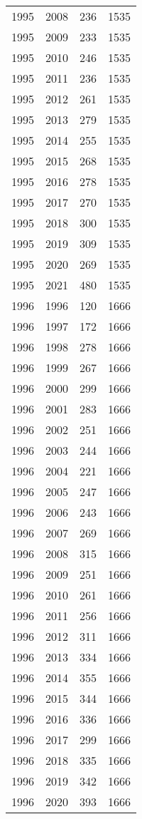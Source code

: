 \documentclass[
  10pt,
  letterpaper,
  DIV=11,
  numbers=noendperiod,
  twoside]{scrartcl}
\begin{document}
\begin{longtable}[]{@{}rrrr@{}}
1995 & 2008 & 236 & 1535 \\
1995 & 2009 & 233 & 1535 \\
1995 & 2010 & 246 & 1535 \\
1995 & 2011 & 236 & 1535 \\
1995 & 2012 & 261 & 1535 \\
1995 & 2013 & 279 & 1535 \\
1995 & 2014 & 255 & 1535 \\
1995 & 2015 & 268 & 1535 \\
1995 & 2016 & 278 & 1535 \\
1995 & 2017 & 270 & 1535 \\
1995 & 2018 & 300 & 1535 \\
1995 & 2019 & 309 & 1535 \\
1995 & 2020 & 269 & 1535 \\
1995 & 2021 & 480 & 1535 \\
1996 & 1996 & 120 & 1666 \\
1996 & 1997 & 172 & 1666 \\
1996 & 1998 & 278 & 1666 \\
1996 & 1999 & 267 & 1666 \\
1996 & 2000 & 299 & 1666 \\
1996 & 2001 & 283 & 1666 \\
1996 & 2002 & 251 & 1666 \\
1996 & 2003 & 244 & 1666 \\
1996 & 2004 & 221 & 1666 \\
1996 & 2005 & 247 & 1666 \\
1996 & 2006 & 243 & 1666 \\
1996 & 2007 & 269 & 1666 \\
1996 & 2008 & 315 & 1666 \\
1996 & 2009 & 251 & 1666 \\
1996 & 2010 & 261 & 1666 \\
1996 & 2011 & 256 & 1666 \\
1996 & 2012 & 311 & 1666 \\
1996 & 2013 & 334 & 1666 \\
1996 & 2014 & 355 & 1666 \\
1996 & 2015 & 344 & 1666 \\
1996 & 2016 & 336 & 1666 \\
1996 & 2017 & 299 & 1666 \\
1996 & 2018 & 335 & 1666 \\
1996 & 2019 & 342 & 1666 \\
1996 & 2020 & 393 & 1666 \\

\end{longtable}
\end{document}
